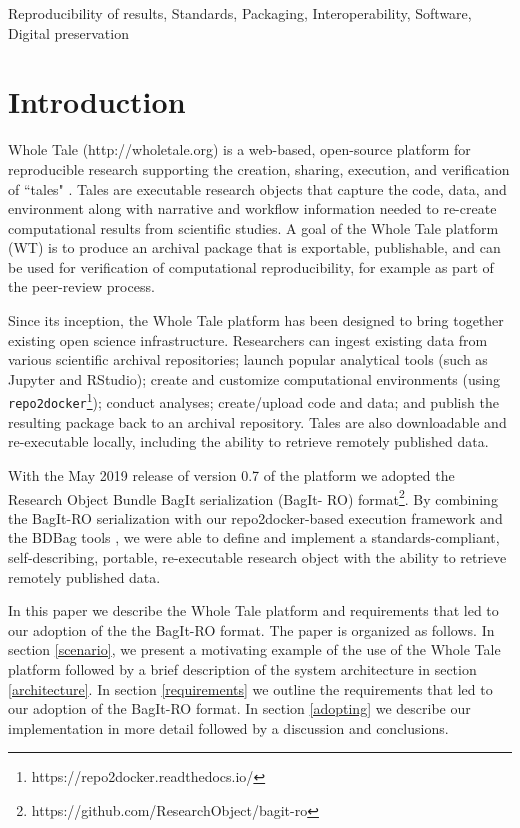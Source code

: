 \documentclass[conference]{IEEEtran}
\begin{document}
\begin{IEEEkeywords}
Reproducibility of results, Standards, Packaging, Interoperability, Software, Digital preservation
\end{IEEEkeywords}

\section{Introduction}

Whole Tale (http://wholetale.org) is a web-based, open-source platform for reproducible research 
supporting the creation, sharing, execution, and verification of ``tales" \cite{brinckman2019, chard2019}. Tales are executable research objects that capture the code, data, and environment along with narrative and workflow information needed to re-create computational results from scientific studies. A goal of the Whole Tale platform (WT) is to produce an archival package that is exportable, publishable, and can be used for verification of computational reproducibility, for example as part of the peer-review process.

Since its inception, the Whole Tale platform has been designed to bring together existing open 
science infrastructure.  Researchers can ingest existing data from various scientific archival 
repositories; launch popular analytical tools (such as Jupyter and RStudio); create and customize 
computational environments (using \texttt{repo2docker}\footnote{https://repo2docker.readthedocs.io/}); 
conduct analyses; create/upload code and data; and publish the resulting package back to an
archival repository. Tales are also downloadable and re-executable locally, including the 
ability to retrieve remotely published data.  

With the May 2019 release of version 0.7 of the platform we adopted the Research Object Bundle BagIt serialization (BagIt-
RO) format\footnote{https://github.com/ResearchObject/bagit-ro}. By combining the BagIt-RO 
serialization with our repo2docker-based execution framework and the BDBag tools 
\cite{chard2016}, we were able to define and implement a standards-compliant, self-describing, 
portable, re-executable research object with the ability to retrieve remotely published data.  

In this paper we describe the Whole Tale platform and requirements that led to our adoption of the
the BagIt-RO format. The paper is organized as follows. In section \ref{scenario}, we present a 
motivating example of the  use of the Whole Tale platform followed by a brief description of the 
system architecture in section \ref{architecture}. In section \ref{requirements} we outline the 
requirements that led to our adoption of the BagIt-RO format. In section \ref{adopting} we describe
our implementation in more detail followed by a discussion and conclusions.
\end{document}
